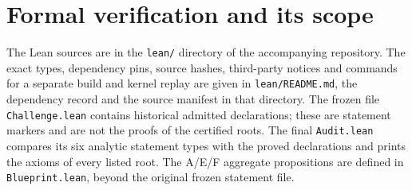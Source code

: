 \section{Formal verification and its scope}\label{app:formal}

The Lean sources are in the \texttt{lean/} directory of the accompanying
repository. The exact types, dependency pins, source hashes, third-party notices
and commands for a separate build and kernel replay are given in
\texttt{lean/README.md}, the dependency record and the source manifest
in that directory. The frozen file \texttt{Challenge.lean}
contains historical admitted declarations; these are statement markers and are
not the proofs of the certified roots. The final \texttt{Audit.lean} compares
its six analytic statement types with the proved declarations and prints the
axioms of every listed root. The A/E/F aggregate propositions are defined in
\texttt{Blueprint.lean}, beyond the original frozen statement file.

